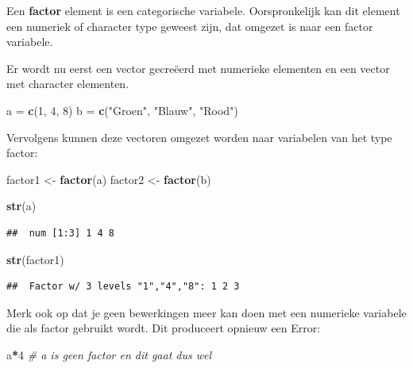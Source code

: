 \documentclass[
]{book}
\newenvironment{Shaded}{\begin{snugshade}}{\end{snugshade}}
\newcommand{\CommentTok}[1]{\textcolor[rgb]{0.56,0.35,0.01}{\textit{#1}}}
\newcommand{\DecValTok}[1]{\textcolor[rgb]{0.00,0.00,0.81}{#1}}
\newcommand{\FunctionTok}[1]{\textcolor[rgb]{0.13,0.29,0.53}{\textbf{#1}}}
\newcommand{\NormalTok}[1]{#1}
\newcommand{\OtherTok}[1]{\textcolor[rgb]{0.56,0.35,0.01}{#1}}
\newcommand{\SpecialCharTok}[1]{\textcolor[rgb]{0.81,0.36,0.00}{\textbf{#1}}}
\newcommand{\StringTok}[1]{\textcolor[rgb]{0.31,0.60,0.02}{#1}}
\begin{document}
Een \textbf{factor} element is een categorische variabele. Oorspronkelijk kan dit element een numeriek of character type geweest zijn, dat omgezet is naar een factor variabele.

Er wordt nu eerst een vector gecreëerd met numerieke elementen en een vector met character elementen.

\begin{Shaded}
\begin{Highlighting}[]
\NormalTok{a }\OtherTok{=} \FunctionTok{c}\NormalTok{(}\DecValTok{1}\NormalTok{, }\DecValTok{4}\NormalTok{, }\DecValTok{8}\NormalTok{)}
\NormalTok{b }\OtherTok{=} \FunctionTok{c}\NormalTok{(}\StringTok{"Groen"}\NormalTok{, }\StringTok{"Blauw"}\NormalTok{, }\StringTok{"Rood"}\NormalTok{)}
\end{Highlighting}
\end{Shaded}

Vervolgens kunnen deze vectoren omgezet worden naar variabelen van het type factor:

\begin{Shaded}
\begin{Highlighting}[]
\NormalTok{factor1 }\OtherTok{\textless{}{-}} \FunctionTok{factor}\NormalTok{(a)}
\NormalTok{factor2 }\OtherTok{\textless{}{-}} \FunctionTok{factor}\NormalTok{(b)}

\FunctionTok{str}\NormalTok{(a)}
\end{Highlighting}
\end{Shaded}

\begin{verbatim}
##  num [1:3] 1 4 8
\end{verbatim}

\begin{Shaded}
\begin{Highlighting}[]
\FunctionTok{str}\NormalTok{(factor1)}
\end{Highlighting}
\end{Shaded}

\begin{verbatim}
##  Factor w/ 3 levels "1","4","8": 1 2 3
\end{verbatim}

Merk ook op dat je geen bewerkingen meer kan doen met een numerieke variabele die als factor gebruikt wordt. Dit produceert opnieuw een Error:

\begin{Shaded}
\begin{Highlighting}[]
\NormalTok{a}\SpecialCharTok{*}\DecValTok{4} \CommentTok{\# a is geen factor en dit gaat dus wel}
\end{Highlighting}
\end{Shaded}
\end{document}
